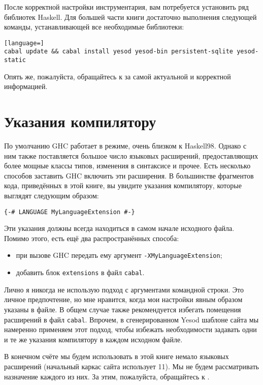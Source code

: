 После корректной настройки инструментария, вам потребуется установить ряд
библиотек Haskell. Для большей части книги достаточно выполнения следующей
команды, устанавливающей все необходимые библиотеки:
\begin{lstlisting}[language=]
cabal update && cabal install yesod yesod-bin persistent-sqlite yesod-static
\end{lstlisting}

Опять же, пожалуйста, обращайтесь к
за самой актуальной и корректной информацией.

\section{Указания компилятору}

По умолчанию GHC работает в режиме, очень близком к Haskell98. Однако с ним
также поставляется большое число языковых расширений, предоставляющих более
мощные классы типов, изменения в синтаксисе и прочее. Есть несколько способов
заставить GHC включить эти расширения. В большинстве фрагментов кода,
приведённых в этой книге, вы увидите указания компилятору, которые выглядят
следующим образом:

\begin{lstlisting}
{-# LANGUAGE MyLanguageExtension #-}
\end{lstlisting}

Эти указания должны всегда находиться в самом начале исходного файла. Помимо
этого, есть ещё два распространённых способа:
\begin{itemize}
\item при вызове GHC передать ему аргумент \lstinline'-XMyLanguageExtension';
\item добавить блок \texttt{extensions} в файл \texttt{cabal}.
\end{itemize}

Лично я никогда не использую подход с аргументами командной строки. Это личное
предпочтение, но мне нравится, когда мои настройки явным образом указаны в
файле. В общем случае также рекомендуется избегать помещения расширений в файл
\texttt{cabal}. Впрочем, в сгенерированном Yesod шаблоне сайта мы намеренно
применяем этот подход, чтобы избежать необходимости задавать одни и те же
указания компилятору в каждом исходном файле.

В конечном счёте мы будем использовать в этой книге немало языковых расширений
(начальный каркас сайта использует 11). Мы не будем рассматривать назначение
каждого из них. За этим, пожалуйста, обращайтесь к
.

